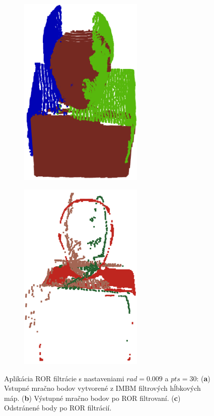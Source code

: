 \begin{figure}[h]
\begin{subfigure}[b]{0.32\textwidth}
		\includegraphics[width=0.65\textwidth]{figures/ror_preserv.png}
		\caption{}
		\label{fig:ror:b}
	\end{subfigure}
	\hfill
	\begin{subfigure}[b]{0.32\textwidth}
		\centering
		\includegraphics[width=0.65\textwidth]{figures/ror_rem.png}
		\caption{}
		\label{fig:ror:c}
	\end{subfigure}
	\caption{Aplikácia ROR filtrácie s nastaveniami $rad=0.009$ a  $pts=30$: (\textbf{a}) Vstupné mračno bodov vytvorené z IMBM filtrových hĺbkových máp. (\textbf{b}) Výstupné mračno bodov po ROR filtrovaní. (\textbf{c}) Odstránené body po ROR filtrácií.}
	\label{fig:ror}
\end{figure}

